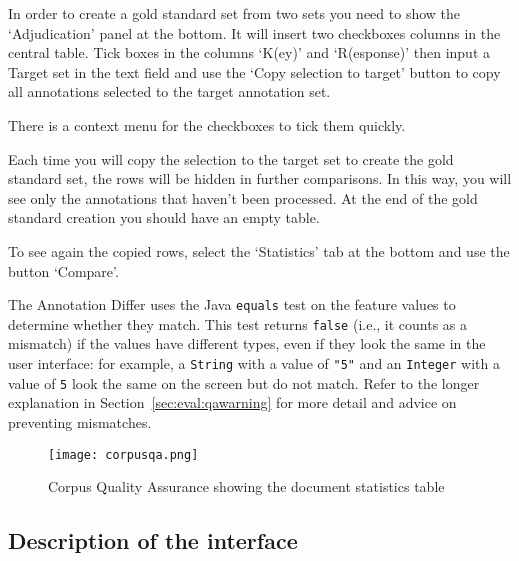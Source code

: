 In order to create a gold standard set from two sets you need to show the
`Adjudication' panel at the bottom. It will insert two checkboxes columns in
the central table. Tick boxes in the columns `K(ey)' and `R(esponse)' then
input a Target set in the text field and use the `Copy selection to target'
button to copy all annotations selected to the target annotation set.

There is a context menu for the checkboxes to tick them quickly.

Each time you will copy the selection to the target set to create the gold
standard set, the rows will be hidden in further comparisons. In this way,
you will see only the annotations that haven't been processed. At the end of
the gold standard creation you should have an empty table.

To see again the copied rows, select the `Statistics' tab at the bottom and
use the button `Compare'.

%
The Annotation Differ uses the Java \texttt{equals} test on the feature values
to determine whether they match.  This test returns \texttt{false} (i.e., it
counts as a mismatch) if the values have different types, even if they look the
same in the user interface: for example, a \texttt{String} with a value of
\texttt{"5"} and an \texttt{Integer} with a value of \texttt{5} look the same on
the screen but do not match.  Refer to the longer explanation in
Section~\ref{sec:eval:qawarning} for more detail and advice on preventing
mismatches.
%

\begin{figure}[htbp]
\begin{center}
\texttt{[image: corpusqa.png]}
\end{center}
\caption{Corpus Quality Assurance showing the document statistics table}
\label{fig:corpusqa}
\end{figure}

\subsection{Description of the interface}

